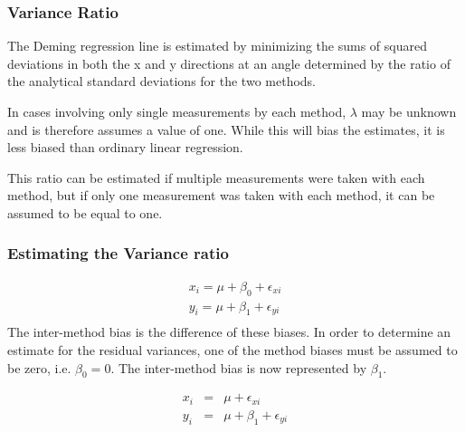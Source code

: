 \documentclass[12pt, a4paper]{report}
\theoremstyle{plain}
\theoremstyle{definition}
\theoremstyle{remark}
\begin{document}
	
	
	
	
	\subsubsection{Variance Ratio}
	
	
	
	
	The Deming regression line is estimated by minimizing the sums of squared deviations in both the x and y directions at an angle determined by the ratio of the analytical standard deviations for the two methods.
	
	In cases involving only single measurements by each method, $\lambda$ may be unknown and is therefore assumes a value of one. While this will bias the estimates, it is less biased than ordinary linear regression.
	
	This ratio can be estimated if multiple measurements were taken with each method, but if only one measurement was taken with each method, it can be assumed to be equal to one.
	
	
	
	
	
	
	
	
	
	
	\subsubsection{Estimating the Variance ratio}
	
	
	\begin{eqnarray*}
		x_{i} = \mu +  \beta_{0} + \epsilon_{xi}\\
		y_{i} = \mu +  \beta_{1} + \epsilon_{yi}\\
	\end{eqnarray*}
	The inter-method bias is the difference of these biases. In order to determine an estimate for the residual variances, one of the method biases must be assumed to be zero, i.e. $\beta_{0} = 0$. The inter-method bias is now represented by $\beta_{1}$.
	
	\begin{eqnarray*}
		x_{i} &=& \mu + \epsilon_{xi}\\
		y_{i} &=& \mu +  \beta_{1} + \epsilon_{yi}\\
	\end{eqnarray*}
	
\end{document}

